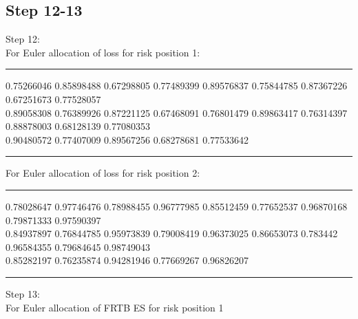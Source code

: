 \documentclass{article}
\begin{document}
\subsection*{Step 12-13}
Step 12:\\
For Euler allocation of loss for risk position 1:\\
\hrule \vspace{5pt}
 0.75266046 0.85898488 0.67298805 0.77489399  
 0.89576837 0.75844785 0.87367226 0.67251673 0.77528057 \\
 0.89058308 0.76389926 0.87221125 0.67468091 0.76801479 
 0.89863417 0.76314397 0.88878003 0.68128139 0.77080353 \\
 0.90480572 0.77407009 0.89567256 0.68278681 0.77533642\\
\hrule \vspace{5pt}
\noindent For Euler allocation of loss for risk position 2:\\
\hrule \vspace{5pt}
 0.78028647 0.97746476 0.78988455 0.96777985  
 0.85512459 0.77652537 0.96870168 0.79871333 0.97590397 \\
 0.84937897 0.76844785 0.95973839 0.79008419 0.96373025 
 0.86653073 0.783442   0.96584355 0.79684645 0.98749043 \\
 0.85282197 0.76235874 0.94281946 0.77669267 0.96826207 \\
\hrule \vspace{5pt}
\vspace{15pt}
\noindent Step 13:\\
For Euler allocation of FRTB ES for risk position 1
\begin{table}[H]
\centering
  \label{tab:my-tab1}
  \end{table}
\end{document}
